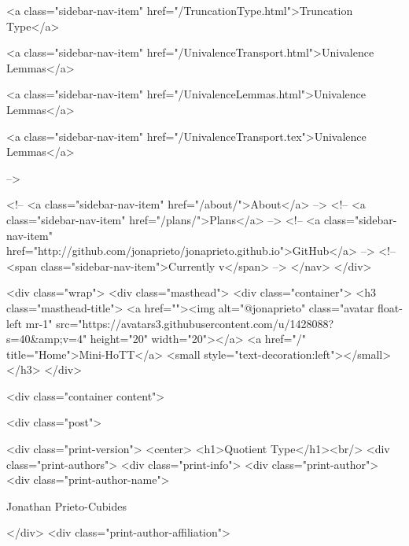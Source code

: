       
    
      
        
          <a class="sidebar-nav-item" href="/TruncationType.html">Truncation Type</a>
        
      
    
      
        
          <a class="sidebar-nav-item" href="/UnivalenceTransport.html">Univalence Lemmas</a>
        
      
    
      
        
          <a class="sidebar-nav-item" href="/UnivalenceLemmas.html">Univalence Lemmas</a>
        
      
    
      
        
          <a class="sidebar-nav-item" href="/UnivalenceTransport.tex">Univalence Lemmas</a>
        
      
     -->

    <!-- <a class="sidebar-nav-item" href="/about/">About</a> -->
    <!-- <a class="sidebar-nav-item" href="/plans/">Plans</a> -->
    <!-- <a class="sidebar-nav-item" href="http://github.com/jonaprieto/jonaprieto.github.io">GitHub</a> -->
    <!-- <span class="sidebar-nav-item">Currently v</span> -->
  </nav>
</div>

    <div class="wrap">
      <div class="masthead">
        <div class="container">
          <h3 class="masthead-title">
            <a href=""><img alt="@jonaprieto" class="avatar float-left mr-1" src="https://avatars3.githubusercontent.com/u/1428088?s=40&amp;v=4" height="20" width="20"></a>
            <a href="/" title="Home">Mini-HoTT</a>
            <small style="text-decoration:left"></small>
          </h3>
        </div>
      
      <div class="container content">
        







<div class="post">

  <div class="print-version">
    <center>
      <h1>Quotient Type</h1><br/>
        <div class="print-authors">
          <div class="print-info">
            <div class="print-author">
              <div class="print-author-name">
                
                  Jonathan Prieto-Cubides
                
              </div>
              <div class="print-author-affiliation">
                
